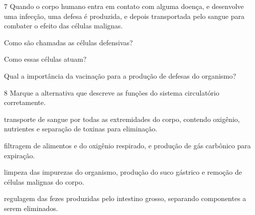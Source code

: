 
\num{7} Quando o corpo humano entra em contato com alguma doença, e
desenvolve uma infecção, uma defesa é produzida, e depois transportada
pelo sangue para combater o efeito das células malignas.

\begin{escolha}
\item Como são chamadas as células defensivas?



\item Como essas células atuam?



\item Qual a importância da vacinação para a produção de defesas do organismo?


\end{escolha}

\num{8} Marque a alternativa que descreve as funções do sistema circulatório corretamente.

\begin{escolha}
\item transporte de sangue por todas as extremidades do corpo, contendo
oxigênio, nutrientes e separação de toxinas para eliminação.

\item filtragem de alimentos e do oxigênio respirado, e produção de gás
carbônico para expiração.

\item limpeza das impurezas do organismo, produção do suco gástrico e
remoção de células malignas do corpo.

\item regulagem das fezes produzidas pelo intestino grosso, separando
componentes a serem eliminados.
\end{escolha}

